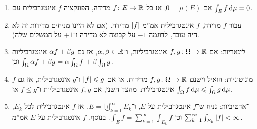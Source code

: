 \documentclass[name=רשימות פונקציות ממשיות – WIP]{../../../tex/classes/noChapterMegasumPreamble}
\begin{document}
	\begin{Claim}
		\begin{enumerate}
			\item אם $0 = \mu(E)$, אז כל $f \colon E \to \mathbb{R}$ מדידה, הפונקציה $f$ אינטגרבילית עם $\int_E f\,\mathrm{d}\mu = 0$. 
			\item עבור $f$ מדידה, $f$ אינטגרבילית אמ''מ $\left \lvert f \right \rvert$ מדידה. (אם לא היינו מניחים מדידות זה לא היה עובד, לדוגמה $-1$ על קבוצה לא מדידה ו־$+ 1$ על המשלים שלה). 
			\item לינאריות: אם $f, g \colon \Omega \to \mathbb{R}$ אינטגרביליות, ו־$\alpha, \beta \in \mathbb{R}$, אז גם $\alpha f + \beta g$ אינטגרביליות וכן $\int_\Omega \alpha f + \beta g = \alpha \int_\Omega f + \beta \int_\Omega g$. 
			\item מונוטוניות: הואיל וישנם $f, g \colon \Omega \to \mathbb{R}$ מדידות. אז אם $\left \lvert f \right \rvert \leqslant g$ ו־$g$ אינטגרבילית, אז גם $f$ אינטגרבילית. מהצד השני, אם $f, g$ אינטגרביליות ו־$f \le g$ אז $\int_\Omega f \,\mathrm{d}\mu \leqslant \int_\Omega g \,\mathrm{d}\mu$. 
			\item \ס־אדטיביות: נניח ש־$f$ אינטגרבילית על $E$, ו־$E = \biguplus_{k = 1}^{\infty}E_k$. אז $f$ אינטגרבילית לכל $E_k$, וכן $\int_E f = \sum_{k = 1}^{\infty}\int_{E_k}f$. בנוסף, $f$ אינטגרבילית על $E$ אמ''מ $\sum_{k = 1}^{\infty}\int_{E_k}\left \lvert f \right \rvert < \infty$. 
		\end{enumerate}
	\end{Claim}
\end{document}
